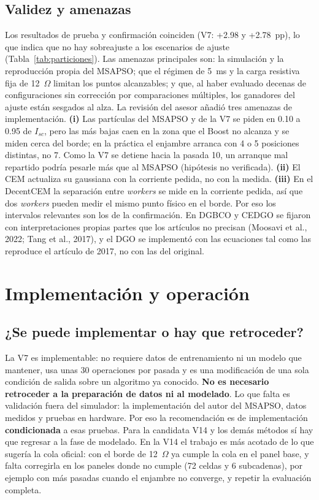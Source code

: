 \documentclass[letterpaper,11pt]{article}
\begin{document}
\subsection{Validez y amenazas}
Los resultados de prueba y confirmación coinciden (V7: +2.98 y +2.78~pp), lo que indica que no hay sobreajuste a los escenarios de ajuste (Tabla~\ref{tab:particiones}). Las amenazas principales son: la simulación y la reproducción propia del MSAPSO; que el régimen de 5~ms y la carga resistiva fija de 12~$\Omega$ limitan los puntos alcanzables; y que, al haber evaluado decenas de configuraciones sin corrección por comparaciones múltiples, los ganadores del ajuste están sesgados al alza. La revisión del asesor añadió tres amenazas de implementación. \textbf{(i)} Las partículas del MSAPSO y de la V7 se piden en 0.10 a 0.95 de $I_{sc}$, pero las más bajas caen en la zona que el Boost no alcanza y se miden cerca del borde; en la práctica el enjambre arranca con 4 o 5 posiciones distintas, no 7. Como la V7 se detiene hacia la pasada 10, un arranque mal repartido podría pesarle más que al MSAPSO (hipótesis no verificada). \textbf{(ii)} El CEM actualiza su gaussiana con la corriente pedida, no con la medida. \textbf{(iii)} En el DecentCEM la separación entre \textit{workers} se mide en la corriente pedida, así que dos \textit{workers} pueden medir el mismo punto físico en el borde. Por eso los intervalos relevantes son los de la confirmación. En DGBCO y CEDGO se fijaron con interpretaciones propias partes que los artículos no precisan (Moosavi et al., 2022; Tang et al., 2017), y el DGO se implementó con las ecuaciones tal como las reproduce el artículo de 2017, no con las del original.

\section{Implementación y operación}

\subsection{¿Se puede implementar o hay que retroceder?}
La V7 es implementable: no requiere datos de entrenamiento ni un modelo que mantener, usa unas 30 operaciones por pasada y es una modificación de una sola condición de salida sobre un algoritmo ya conocido. \textbf{No es necesario retroceder a la preparación de datos ni al modelado}. Lo que falta es validación fuera del simulador: la implementación del autor del MSAPSO, datos medidos y pruebas en hardware. Por eso la recomendación es de implementación \textbf{condicionada} a esas pruebas. Para la candidata V14 y los demás métodos sí hay que regresar a la fase de modelado. En la V14 el trabajo es más acotado de lo que sugería la cola oficial: con el borde de 12~$\Omega$ ya cumple la cola en el panel base, y falta corregirla en los paneles donde no cumple (72 celdas y 6 subcadenas), por ejemplo con más pasadas cuando el enjambre no converge, y repetir la evaluación completa.
\end{document}
